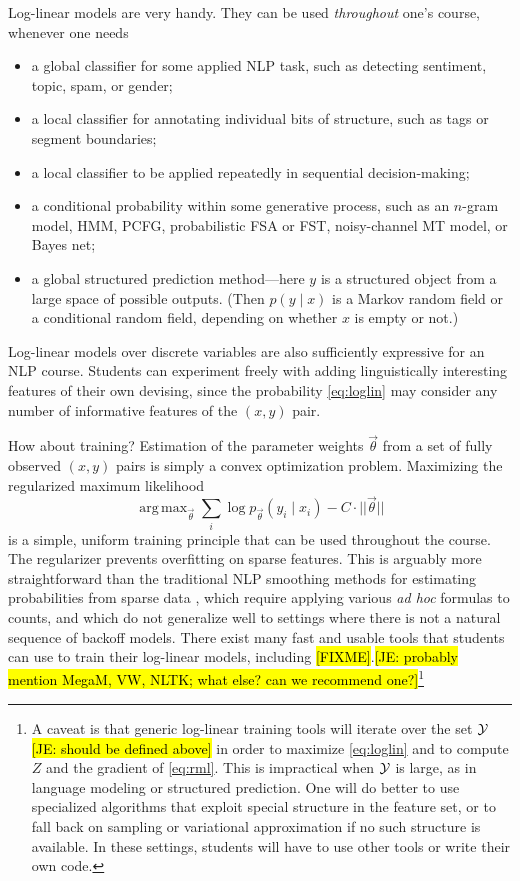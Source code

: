 \documentclass[11pt,letterpaper]{article}
\DeclareMathOperator*{\argmax}{arg\,max}
\newcommand{\Note}[1]{}
\renewcommand{\Note}[1]{\hl{[#1]}}
\newcommand{\FIXME}{\Note{FIXME}}
\newcommand{\NoteSigned}[3]{{\sethlcolor{#2}\Note{#1: #3}}}
\newcommand{\NoteJE}[1]{\NoteSigned{JE}{LightGreen}{#1}}
\begin{document}
Log-linear models are very handy.  They can be used {\em throughout} 
one's course, whenever one needs 
\begin{itemize}
\item a global classifier for some applied NLP task, such as detecting
  sentiment, topic, spam, or gender;
\item a local classifier for annotating individual bits of structure, 
  such as tags or segment boundaries;
\item a local classifier to be applied repeatedly in sequential decision-making;
\item a conditional probability within some generative process, such
  as an $n$-gram model, HMM, PCFG, probabilistic FSA or FST, noisy-channel MT model,
  or Bayes net;
\item a global structured prediction method---here $y$ is a structured
  object from a large space of possible outputs.  (Then $p(y \mid x)$ is a
  Markov random field or a conditional random field, depending on whether 
  $x$ is empty or not.)
\end{itemize}  

Log-linear models over discrete variables are also sufficiently
expressive for an NLP course.  Students can experiment freely with
adding linguistically interesting features of their own devising,
since the probability \eqref{eq:loglin} may consider any number of
informative features of the $(x,y)$ pair.

How about training?  Estimation of the parameter weights
$\vec{\theta}$ from a set of fully observed $(x,y)$ pairs is simply a
convex optimization problem.  Maximizing the regularized maximum
likelihood
\begin{equation}\label{eq:rml}
  \argmax_{\vec{\theta}} \sum_i \log p_{\vec{\theta}}(y_i \mid x_i) - C\cdot ||\vec{\theta}||
\end{equation}
is a simple, uniform training principle that can be used throughout
the course.  The regularizer prevents overfitting on sparse features.
This is arguably more straightforward than the traditional NLP
smoothing methods for estimating probabilities from sparse data
\cite{chen-goodman-1996}, which require applying various {\em ad hoc}
formulas to counts, and which do not generalize well to settings where
there is not a natural sequence of backoff models.  There exist many
fast and usable tools that students can use to train their log-linear
models, including \FIXME.\NoteJE{probably mention MegaM, VW, NLTK;
  what else?  can we recommend one?}\footnote{\label{fn:bigY}A caveat is that generic
  log-linear training tools will iterate over the set ${\cal
    Y}$\NoteJE{should be defined above} in order to maximize
  \eqref{eq:loglin} and to compute $Z$ and the gradient of
  \eqref{eq:rml}.  This is impractical when ${\cal Y}$ is large, as in
  language modeling or structured prediction.  One will do better to
  use specialized algorithms that exploit special structure in the
  feature set, or to fall back on sampling or variational
  approximation if no such structure is available.  In these settings,
  students will have to use other tools or write their own code.}
\end{document}
